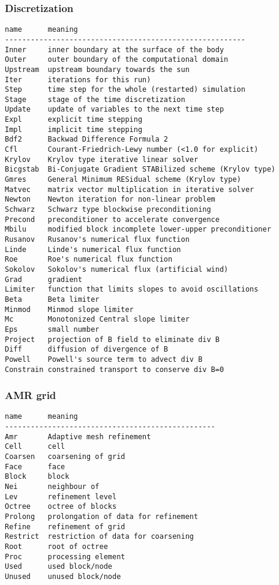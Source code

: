 \subsubsection{Discretization}

\begin{verbatim}
name      meaning
--------------------------------------------------------
Inner     inner boundary at the surface of the body
Outer     outer boundary of the computational domain
Upstream  upstream boundary towards the sun
Iter      iterations for this run)
Step      time step for the whole (restarted) simulation
Stage     stage of the time discretization
Update    update of variables to the next time step
Expl      explicit time stepping
Impl      implicit time stepping
Bdf2      Backwad Difference Formula 2
Cfl       Courant-Friedrich-Lewy number (<1.0 for explicit)
Krylov    Krylov type iterative linear solver
Bicgstab  Bi-Conjugate Gradient STABilized scheme (Krylov type)
Gmres     General Minimum RESidual scheme (Krylov type)
Matvec    matrix vector multiplication in iterative solver
Newton    Newton iteration for non-linear problem
Schwarz   Schwarz type blockwise preconditioning
Precond   preconditioner to accelerate convergence
Mbilu     modified block incomplete lower-upper preconditioner
Rusanov   Rusanov's numerical flux function
Linde     Linde's numerical flux function
Roe       Roe's numerical flux function
Sokolov   Sokolov's numerical flux (artificial wind)
Grad      gradient
Limiter   function that limits slopes to avoid oscillations
Beta      Beta limiter
Minmod    Minmod slope limiter
Mc        Monotonized Central slope limiter
Eps       small number
Project   projection of B field to eliminate div B
Diff      diffusion of divergence of B
Powell    Powell's source term to advect div B
Constrain constrained transport to conserve div B=0
\end{verbatim}

\subsubsection{AMR grid}

\begin{verbatim}
name      meaning
-------------------------------------------------
Amr       Adaptive mesh refinement
Cell      cell
Coarsen   coarsening of grid
Face      face
Block     block
Nei       neighbour of
Lev       refinement level
Octree    octree of blocks
Prolong   prolongation of data for refinement
Refine    refinement of grid
Restrict  restriction of data for coarsening
Root      root of octree
Proc      processing element
Used      used block/node
Unused    unused block/node
\end{verbatim}


%





